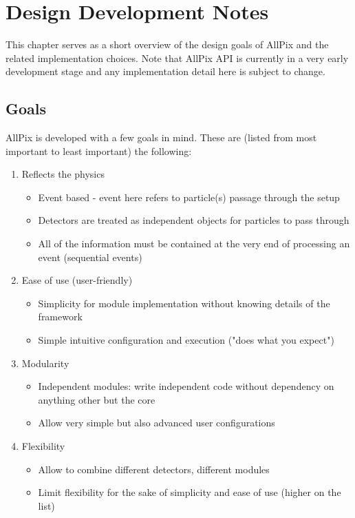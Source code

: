 \section{Design Development Notes}
This chapter serves as a short overview of the design goals of AllPix and the related implementation choices. Note that AllPix API is currently in a very early development stage and any implementation detail here is subject to change.

\subsection{Goals}
AllPix is developed with a few goals in mind. These are (listed from most important to least important) the following:
\begin{enumerate}
    \item Reflects the physics
    \begin{itemize}
        \item Event based - event here refers to particle(s) passage through the setup
        \item Detectors are treated as independent objects for particles to pass through
        \item All of the information must be contained at the very end of processing an event (sequential events)
    \end{itemize}
    \item Ease of use (user-friendly)
    \begin{itemize}
        \item Simplicity for module implementation without knowing details of the framework
        \item Simple intuitive configuration and execution ("does what you expect")
    \end{itemize}
    \item Modularity
    \begin{itemize}
        \item Independent modules: write independent code without dependency on anything other but the core
        \item Allow very simple but also advanced user configurations
    \end{itemize}
    \item Flexibility
    \begin{itemize}
        \item Allow to combine different detectors, different modules
        \item Limit flexibility for the sake of simplicity and ease of use (higher on the list)
    \end{itemize}
\end{enumerate}

